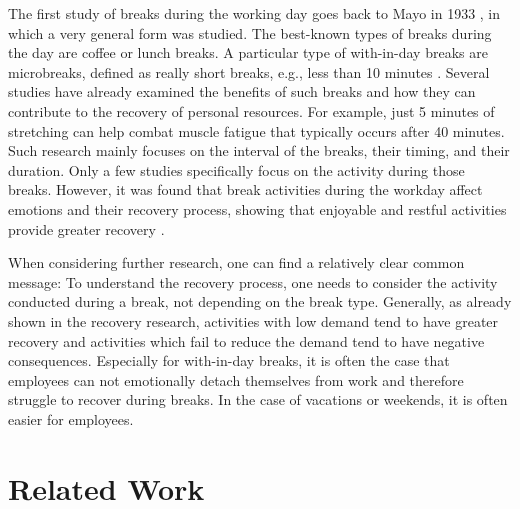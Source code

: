 \documentclass{hasel_thesis}
\begin{document}
The first study of breaks during the working day goes back to Mayo in 1933 \cite{Mayo.1933}, in which a very general form was studied. The best-known types of breaks during the day are coffee or lunch breaks. A particular type of with-in-day breaks are microbreaks, defined as really short breaks, e.g., less than 10 minutes \cite{BennettAndrewA.GabrielAllisonS.CalderwoodCharles.2020}. Several studies have already examined the benefits of such breaks and how they can contribute to the recovery of personal resources. For example, just 5 minutes of stretching can help combat muscle fatigue that typically occurs after 40 minutes. Such research mainly focuses on the interval of the breaks, their timing, and their duration. Only a few studies specifically focus on the activity during those breaks. However, it was found that break activities during the workday affect emotions and their recovery process, showing that enjoyable and restful activities provide greater recovery \cite{Trougakos2008}. 

When considering further research, one can find a relatively clear common message: To understand the recovery process, one needs to consider the activity conducted during a break, not depending on the break type. Generally, as already shown in the recovery research, activities with low demand tend to have greater recovery and activities which fail to reduce the demand tend to have negative consequences. Especially for with-in-day breaks, it is often the case that employees can not emotionally detach themselves from work and therefore struggle to recover during breaks. In the case of vacations or weekends, it is often easier for employees.



\chapter{Related Work} \label{related_work}

\end{document}
